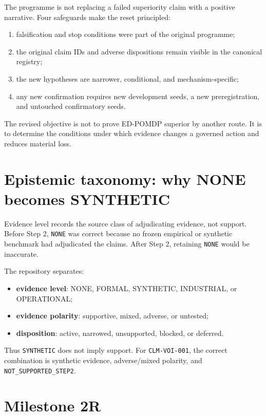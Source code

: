 \documentclass[11pt,a4paper]{article}
\begin{document}
The programme is not replacing a failed superiority claim with a positive narrative. Four safeguards make the reset principled:
\begin{enumerate}
  \item falsification and stop conditions were part of the original programme;
  \item the original claim IDs and adverse dispositions remain visible in the canonical registry;
  \item the new hypotheses are narrower, conditional, and mechanism-specific;
  \item any new confirmation requires new development seeds, a new preregistration, and untouched confirmatory seeds.
\end{enumerate}

The revised objective is not to prove ED-POMDP superior by another route. It is to determine the conditions under which evidence changes a governed action and reduces material loss.

\section{Epistemic taxonomy: why NONE becomes SYNTHETIC}

Evidence level records the source class of adjudicating evidence, not support. Before Step 2, \texttt{NONE} was correct because no frozen empirical or synthetic benchmark had adjudicated the claims. After Step 2, retaining \texttt{NONE} would be inaccurate.

The repository separates:
\begin{itemize}
  \item \textbf{evidence level}: NONE, FORMAL, SYNTHETIC, INDUSTRIAL, or OPERATIONAL;
  \item \textbf{evidence polarity}: supportive, mixed, adverse, or untested;
  \item \textbf{disposition}: active, narrowed, unsupported, blocked, or deferred.
\end{itemize}

Thus \texttt{SYNTHETIC} does not imply support. For \texttt{CLM-VOI-001}, the correct combination is synthetic evidence, adverse/mixed polarity, and \texttt{NOT\_SUPPORTED\_STEP2}.

\section{Milestone 2R}
\end{document}
